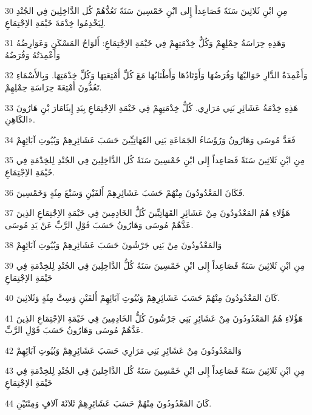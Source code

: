 \par 30 مِنِ ابْنِ ثَلاثِينَ سَنَةً فَصَاعِداً إِلى ابْنِ خَمْسِينَ سَنَةً تَعُدُّهُمْ كُل الدَّاخِلِينَ فِي الجُنْدِ لِيَخْدِمُوا خِدْمَةَ خَيْمَةِ الاِجْتِمَاعِ.
\par 31 وَهَذِهِ حِرَاسَةُ حِمْلِهِمْ وَكُلُّ خِدْمَتِهِمْ فِي خَيْمَةِ الاِجْتِمَاعِ: أَلوَاحُ المَسْكَنِ وَعَوَارِضُهُ وَأَعْمِدَتُهُ وَفُرَضُهُ
\par 32 وَأَعْمِدَةُ الدَّارِ حَوَاليْهَا وَفُرَضُهَا وَأَوْتَادُهَا وَأَطْنَابُهَا مَعَ كُلِّ أَمْتِعَتِهَا وَكُلِّ خِدْمَتِهَا. وَبِالأَسْمَاءِ تَعُدُّونَ أَمْتِعَةَ حِرَاسَةِ حِمْلِهِمْ.
\par 33 هَذِهِ خِدْمَةُ عَشَائِرِ بَنِي مَرَارِي. كُلُّ خِدْمَتِهِمْ فِي خَيْمَةِ الاِجْتِمَاعِ بِيَدِ إِيثَامَارَ بْنِ هَارُونَ الكَاهِنِ».
\par 34 فَعَدَّ مُوسَى وَهَارُونُ وَرُؤَسَاءُ الجَمَاعَةِ بَنِي القَهَاتِيِّينَ حَسَبَ عَشَائِرِهِمْ وَبُيُوتِ آبَائِهِمْ
\par 35 مِنِ ابْنِ ثَلاثِينَ سَنَةً فَصَاعِداً إِلى ابْنِ خَمْسِينَ سَنَةً كُل الدَّاخِلِينَ فِي الجُنْدِ لِلخِدْمَةِ فِي خَيْمَةِ الاِجْتِمَاعِ.
\par 36 فَكَانَ المَعْدُودُونَ مِنْهُمْ حَسَبَ عَشَائِرِهِمْ أَلفَيْنِ وَسَبْعَ مِئَةٍ وَخَمْسِينَ.
\par 37 هَؤُلاءِ هُمُ المَعْدُودُونَ مِنْ عَشَائِرِ القَهَاتِيِّينَ كُلُّ الخَادِمِينَ فِي خَيْمَةِ الاِجْتِمَاعِ الذِينَ عَدَّهُمْ مُوسَى وَهَارُونُ حَسَبَ قَوْلِ الرَّبِّ عَنْ يَدِ مُوسَى.
\par 38 وَالمَعْدُودُونَ مِنْ بَنِي جَرْشُونَ حَسَبَ عَشَائِرِهِمْ وَبُيُوتِ آبَائِهِمْ
\par 39 مِنِ ابْنِ ثَلاثِينَ سَنَةً فَصَاعِداً إِلى ابْنِ خَمْسِينَ سَنَةً كُلُّ الدَّاخِلِينَ فِي الجُنْدِ لِلخِدْمَةِ فِي خَيْمَةِ الاِجْتِمَاعِ
\par 40 كَانَ المَعْدُودُونَ مِنْهُمْ حَسَبَ عَشَائِرِهِمْ وَبُيُوتِ آبَائِهِمْ أَلفَيْنِ وَسِتَّ مِئَةٍ وَثَلاثِينَ.
\par 41 هَؤُلاءِ هُمُ المَعْدُودُونَ مِنْ عَشَائِرِ بَنِي جَرْشُونَ كُلُّ الخَادِمِينَ فِي خَيْمَةِ الاِجْتِمَاعِ الذِينَ عَدَّهُمْ مُوسَى وَهَارُونُ حَسَبَ قَوْلِ الرَّبِّ.
\par 42 وَالمَعْدُودُونَ مِنْ عَشَائِرِ بَنِي مَرَارِي حَسَبَ عَشَائِرِهِمْ وَبُيُوتِ آبَائِهِمْ
\par 43 مِنِ ابْنِ ثَلاثِينَ سَنَةً فَصَاعِداً إِلى ابْنِ خَمْسِينَ سَنَةً كُل الدَّاخِلينَ فِي الجُنْدِ لِلخِدْمَةِ فِي خَيْمَةِ الاِجْتِمَاعِ
\par 44 كَانَ المَعْدُودُونَ مِنْهُمْ حَسَبَ عَشَائِرِهِمْ ثَلاثَةَ آلافٍ وَمِئَتَيْنِ.
